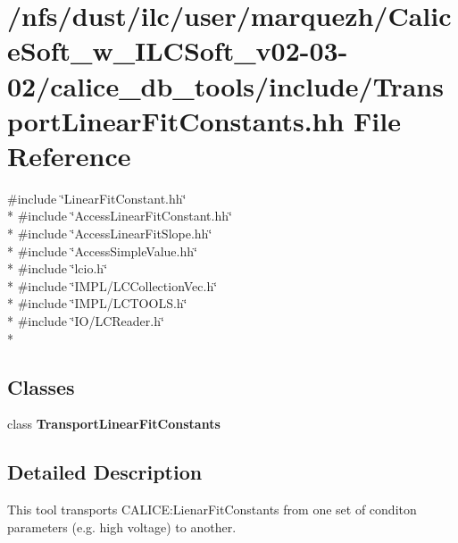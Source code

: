 \section{/nfs/dust/ilc/user/marquezh/\-Calice\-Soft\-\_\-w\-\_\-\-I\-L\-C\-Soft\-\_\-v02-\/03-\/02/calice\-\_\-db\-\_\-tools/include/\-Transport\-Linear\-Fit\-Constants.hh File Reference}
\label{TransportLinearFitConstants_8hh}
{\ttfamily \#include \char`\"{}Linear\-Fit\-Constant.\-hh\char`\"{}}\\*
{\ttfamily \#include \char`\"{}Access\-Linear\-Fit\-Constant.\-hh\char`\"{}}\\*
{\ttfamily \#include \char`\"{}Access\-Linear\-Fit\-Slope.\-hh\char`\"{}}\\*
{\ttfamily \#include \char`\"{}Access\-Simple\-Value.\-hh\char`\"{}}\\*
{\ttfamily \#include \char`\"{}lcio.\-h\char`\"{}}\\*
{\ttfamily \#include \char`\"{}I\-M\-P\-L/\-L\-C\-Collection\-Vec.\-h\char`\"{}}\\*
{\ttfamily \#include \char`\"{}I\-M\-P\-L/\-L\-C\-T\-O\-O\-L\-S.\-h\char`\"{}}\\*
{\ttfamily \#include \char`\"{}I\-O/\-L\-C\-Reader.\-h\char`\"{}}\\*
\subsection*{Classes}
\begin{DoxyCompactItemize}
\item 
class {\bf Transport\-Linear\-Fit\-Constants}
\end{DoxyCompactItemize}


\subsection{Detailed Description}
This tool transports C\-A\-L\-I\-C\-E\-:Lienar\-Fit\-Constants from one set of conditon parameters (e.\-g. high voltage) to another.

